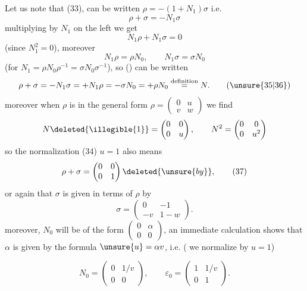 
Let us note that (33), can be written $\rho=-(1+N_1)\sigma$ i.e.
\[
\rho+\sigma=-N_1\sigma \tag{35}
\]
multiplying by $N_1$ on the left we get
\[
N_1\rho+N_1\sigma=0
\]
(since $N_1^2=0$), moreover
\[
N_1\rho=\rho N_0,\qquad N_1\sigma=\sigma N_0
\]
(for $N_1=\rho N_0\rho^{-1}=\sigma N_0\sigma^{-1}$), so () can be written
\[
\rho+\sigma=-N_1\sigma=+N_1\rho=-\sigma N_0=+\rho N_0
\overset{\text{definition}}{=}N . \tag{\unsure{35|36}}
\]
moreover when $\rho$ is in the general form
$\rho=\begin{pmatrix}0&u\\v&w\end{pmatrix}$ we find
\[
N\deleted{\illegible{1}}=\begin{pmatrix}0&0\\0&u\end{pmatrix},
\qquad N^2=\begin{pmatrix}0&0\\0&u^2\end{pmatrix}
\]
so the normalization (34) $u=1$ also means
\[
\rho+\sigma=\begin{pmatrix}0&0\\0&1\end{pmatrix}\deleted{\unsure{by}}, \tag{37}
\]
or again that $\sigma$ is given in terms of $\rho$ by
\[
\sigma=\begin{pmatrix}0&-1\\-v&1-w\end{pmatrix}. \tag{38}
\]
moreover, $N_0$  will be of the form
$\begin{pmatrix}0&\alpha\\0&0\end{pmatrix}$,
an immediate calculation shows that $\alpha$ is given by the formula
$\unsure{u}=\alpha v$, i.e. ( we normalize by $u=1$)



\[
N_0=\begin{pmatrix}0&1/v\\0&0\end{pmatrix},\qquad
\varepsilon_0=\begin{pmatrix}1&1/v\\0&1\end{pmatrix}. \tag{39}
\]

